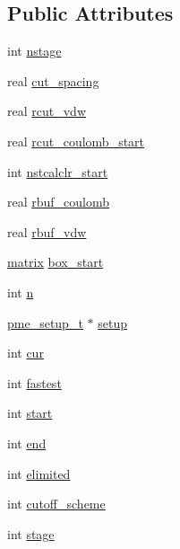 \subsection*{\-Public \-Attributes}
\begin{DoxyCompactItemize}
\item 
int \hyperlink{structpme__load__balancing_a1ad3c0c762a7f5e62c8058d4d04e0336}{nstage}
\item 
real \hyperlink{structpme__load__balancing_a8c634757df9c6d3f4dd8dedeacb040f1}{cut\-\_\-spacing}
\item 
real \hyperlink{structpme__load__balancing_a46b3e51eec7f01c729a6f3033ed5a413}{rcut\-\_\-vdw}
\item 
real \hyperlink{structpme__load__balancing_ae3fccf4e1d5f0ca85f22ed3f87035f0a}{rcut\-\_\-coulomb\-\_\-start}
\item 
int \hyperlink{structpme__load__balancing_a286c88139505b50fef688fa0606b7d07}{nstcalclr\-\_\-start}
\item 
real \hyperlink{structpme__load__balancing_aed62d1173d960f05dc9611692eaa2c6c}{rbuf\-\_\-coulomb}
\item 
real \hyperlink{structpme__load__balancing_a31bb31c3a8805138536c04597874f3ef}{rbuf\-\_\-vdw}
\item 
\hyperlink{share_2template_2gromacs_2types_2simple_8h_a7ea9c2a830d3f743b887387e33645a83}{matrix} \hyperlink{structpme__load__balancing_a2c85937eb123311bfc02e5d75bf0684d}{box\-\_\-start}
\item 
int \hyperlink{structpme__load__balancing_a6368ad8d562f96e1d1ee8f51a0ddc8db}{n}
\item 
\hyperlink{structpme__setup__t}{pme\-\_\-setup\-\_\-t} $\ast$ \hyperlink{structpme__load__balancing_a73533de71959d0fdae10ad3f74ff2754}{setup}
\item 
int \hyperlink{structpme__load__balancing_a89209ef97da78d546f7e7d23120850bd}{cur}
\item 
int \hyperlink{structpme__load__balancing_aa519d7907368e284586d62cfe62150cc}{fastest}
\item 
int \hyperlink{structpme__load__balancing_a1694f88c362fab71d022d5572c29e280}{start}
\item 
int \hyperlink{structpme__load__balancing_a89499890485e78d55e9a59f241037885}{end}
\item 
int \hyperlink{structpme__load__balancing_aef4fbedb1e7ac85248a52993d2c6f40e}{elimited}
\item 
int \hyperlink{structpme__load__balancing_adccf701db9a98ea7aa20effc1b0d921d}{cutoff\-\_\-scheme}
\item 
int \hyperlink{structpme__load__balancing_a15c9ecc11385e6fc5c2dc0ab26baecd9}{stage}
\end{DoxyCompactItemize}



